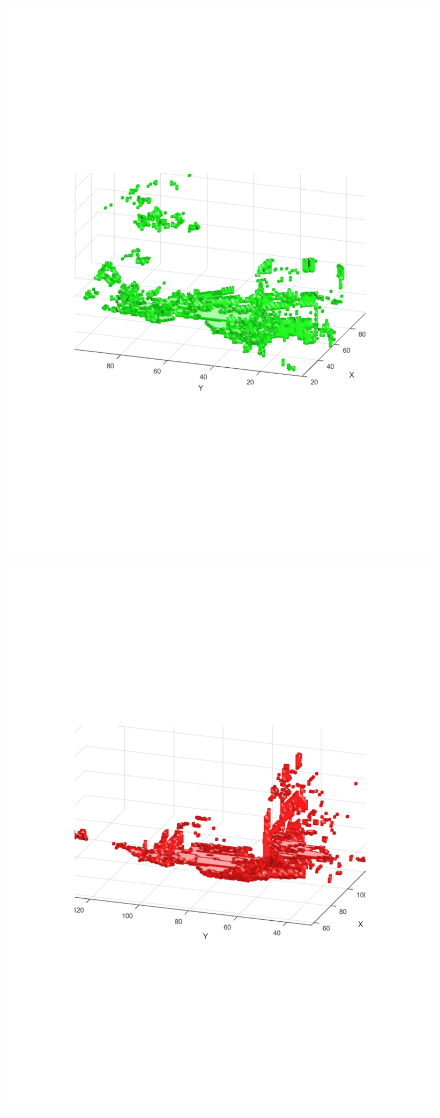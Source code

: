 \documentclass{UCF_ETD}
\begin{document}
\begin{figure}[H]
\begin{center}
\includegraphics[scale=0.52]{RobustRegistration/Scan12}
\includegraphics[scale=0.52]{RobustRegistration/Scan13}

\end{center}
\end{figure}
\end{document}
